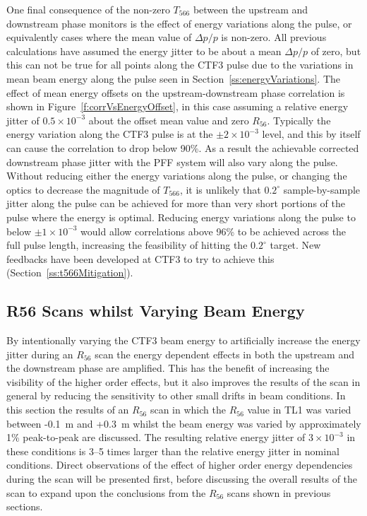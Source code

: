One final consequence of the non-zero \(T_{566}\) between the upstream and downstream phase monitors is the effect of energy variations along the pulse, or equivalently cases where the mean value of \(\Delta p/p\) is non-zero. All previous calculations have assumed the energy jitter to be about a mean \(\Delta p / p\) of zero, but this can not be true for all points along the CTF3 pulse due to the variations in mean beam energy along the pulse seen in Section~\ref{ss:energyVariations}. The effect of mean energy offsets on the upstream-downstream phase correlation is shown in Figure~\ref{f:corrVsEnergyOffset}, in this case assuming a relative energy jitter of \(0.5\times10^{-3}\) about the offset mean value and zero \(R_{56}\). Typically the energy variation along the CTF3 pulse is at the \(\pm2\times10^{-3}\) level, and this by itself can cause the correlation to drop below 90\%. As a result the achievable corrected downstream phase jitter with the PFF system will also vary along the pulse. Without reducing either the energy variations along the pulse, or changing the optics to decrease the magnitude of \(T_{566}\), it is unlikely that \(0.2^\circ\) sample-by-sample jitter along the pulse can be achieved for more than very short portions of the pulse where the energy is optimal. Reducing energy variations along the pulse to below \(\pm1 \times10^{-3}\) would allow correlations above 96\% to be achieved across the full pulse length, increasing the feasibility of hitting the \(0.2^\circ\) target. New feedbacks have been developed at CTF3 to try to achieve this (Section~\ref{ss:t566Mitigation}).



\subsection{R56 Scans whilst Varying Beam Energy}
\label{ss:r56ScanWithEnergy}

By intentionally varying the CTF3 beam energy to artificially increase the energy jitter during an \(R_{56}\) scan the energy dependent effects in both the upstream and the downstream phase are amplified. This has the benefit of increasing the visibility of the higher order effects, but it also improves the results of the scan in general by reducing the sensitivity to other small drifts in beam conditions. In this section the results of an \(R_{56}\) scan in which the \(R_{56}\) value in TL1 was varied between -0.1~m and +0.3~m whilst the beam energy was varied by approximately 1\% peak-to-peak are discussed. The resulting relative energy jitter of \(3\times10^{-3}\) in these conditions is 3--5 times larger than the relative energy jitter in nominal conditions. Direct observations of the effect of higher order energy dependencies during the scan will be presented first, before discussing the overall results of the scan to expand upon the conclusions from the \(R_{56}\) scans shown in previous sections.

